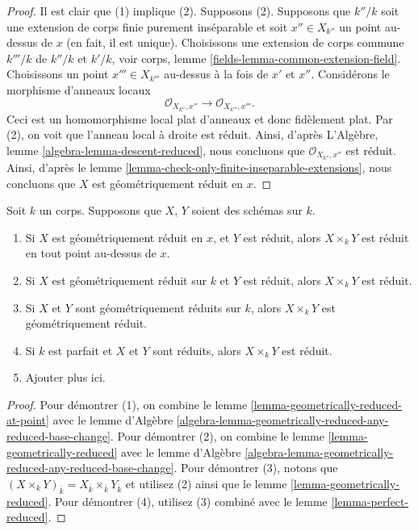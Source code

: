 \begin{proof}
Il est clair que (1) implique (2). Supposons (2). Supposons que
$k''/k$ soit une extension de corps finie purement inséparable et
soit $x'' \in X_{k''}$ un point au-dessus de $x$ (en fait, il
est unique). Choisissons une extension de corps commune $k'''/k$ de
$k''/k$ et $k'/k$, voir corps, lemme
\ref{fields-lemma-common-extension-field}. Choisissons un point $x''' \in X_{k'''}$
au-dessus à la fois de $x'$ et $x''$. Considérons le morphisme d'anneaux locaux
$$
\mathcal{O}_{X_{k''}, x''} \longrightarrow \mathcal{O}_{X_{k'''}, x'''}.
$$
Ceci est un homomorphisme local plat d'anneaux et donc fidèlement
plat. Par (2), on voit que l'anneau local à droite est réduit.
Ainsi, d'après L'Algèbre, lemme
\ref{algebra-lemma-descent-reduced}, nous concluons que
$\mathcal{O}_{X_{k''}, x''}$ est réduit. Ainsi, d'après le lemme
\ref{lemma-check-only-finite-inseparable-extensions}, nous concluons que $X$ est géométriquement réduit en $x$.
\end{proof}

\begin{lemma}
\label{lemma-geometrically-reduced-any-base-change}
Soit $k$ un corps. Supposons que $X$, $Y$ soient des schémas sur $k$.
\begin{enumerate}
\item Si $X$ est géométriquement réduit en $x$, et
$Y$ est réduit, alors $X \times_k Y$ est réduit
en tout point au-dessus de $x$. \item Si $X$ est
géométriquement réduit sur $k$ et $Y$ est réduit,
alors $X \times_k Y$ est réduit. \item Si $X$ et
$Y$ sont géométriquement réduits sur $k$, alors $X
\times_k Y$ est géométriquement réduit. \item Si
$k$ est parfait et $X$ et $Y$ sont réduits, alors
$X \times_k Y$ est réduit. \item Ajouter plus ici.
\end{enumerate}
\end{lemma}

\begin{proof}
Pour démontrer (1), on combine le lemme
\ref{lemma-geometrically-reduced-at-point} avec le lemme
d'Algèbre
\ref{algebra-lemma-geometrically-reduced-any-reduced-base-change}.
Pour démontrer (2), on combine le lemme
\ref{lemma-geometrically-reduced} avec le lemme d'Algèbre
\ref{algebra-lemma-geometrically-reduced-any-reduced-base-change}.
Pour démontrer (3), notons que $(X \times_k Y)_{\overline{k}} =
X_{\overline{k}} \times_{\overline{k}} Y_{\overline{k}}$ et utilisez
(2) ainsi que le lemme \ref{lemma-geometrically-reduced}. Pour démontrer
(4), utilisez (3) combiné avec le lemme \ref{lemma-perfect-reduced}.
\end{proof}

